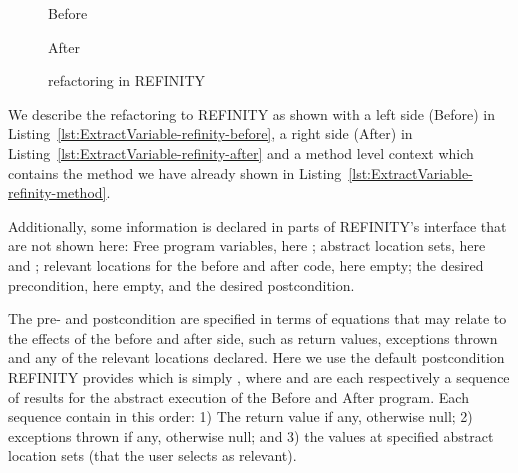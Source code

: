 \begin{figure}[tbp]
  \captionsetup{type=lstlisting}
  \centering
  \begin{sublstlisting}[b]{.34\linewidth}
    
    \vspace{-2mm}
    \caption{Before}
    \label{lst:ExtractVariable-refinity-before}
  \end{sublstlisting}\hspace{1cm}
  \begin{sublstlisting}[b]{.34\linewidth}
    
    \vspace{-2mm}
    \caption{After}
    \label{lst:ExtractVariable-refinity-after}
  \end{sublstlisting}
\caption{ refactoring in REFINITY}
\label{lst:ExtractVariable-refinity}
\end{figure}

We describe the refactoring to REFINITY as shown with a left side (Before) in Listing~\ref{lst:ExtractVariable-refinity-before},
a right side (After) in Listing~\ref{lst:ExtractVariable-refinity-after} and a method level context which contains the method we have already shown in Listing~\ref{lst:ExtractVariable-refinity-method}.

Additionally, some information is declared in parts of REFINITY's interface that are not shown here:
Free program variables, here ; abstract location sets, here  and ; relevant locations for the before and after code, here empty;
the desired precondition, here empty, and the desired postcondition.

The pre- and postcondition are specified in terms of equations that may relate to the effects of the before and after side, such as return values, exceptions thrown and any of the relevant locations declared.
Here we use the default postcondition REFINITY provides which is simply , where  and 
are each respectively a sequence of results for the abstract execution of the Before and After program.
Each sequence contain in this order:
1) The return value if any, otherwise null;
2) exceptions thrown if any, otherwise null;
and 3) the values at specified abstract location sets (that the user selects as relevant).

